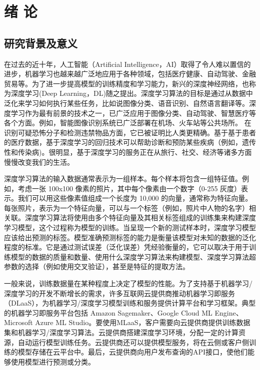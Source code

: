 \chapter{绪\hskip 0.4cm 论}
\label{ch1}

\section{研究背景及意义}
在过去的近十年，人工智能（Artificial Intelligence，AI）取得了令人难以置信的进步，机器学习也越来越广泛地应用于各种领域，包括医疗健康、自动驾驶、金融贸易等。为了进一步提高模型的训练精度和学习能力，新兴的深度神经网络，也称为深度学习(Deep Learning，DL)随之提出。深度学习算法的目标是通过从数据中泛化来学习如何执行某些任务，比如说图像分类、语音识别、自然语言翻译等。深度学习作为最有前景的技术之一，已广泛应用于图像分类、自动驾驶、智慧医疗等各个方面。例如，智能图像识别系统已广泛部署在机场、火车站等公共场所。 在识别可疑恐怖分子和检测违禁物品方面，它已被证明比人类更精确。基于基于患者的医疗数据，基于深度学习的回归技术可以帮助诊断和预防某些疾病（例如，遗传性和传染病)。很明显，基于深度学习的服务正在从旅行、社交、经济等诸多方面慢慢改变我们的生活。

深度学习算法的输入数据通常表示为一组样本。每个样本将包含一组特征值。例如，考虑一张 100x100 像素的照片，其中每个像素由一个数字（0-255 灰度）表示。我们可以用这些像素值组成一个长度为 10,000 的向量，通常称为特征向量。每张照片，表示为一个特征向量，可以与一个标签（例如，照片中人物的名字）相关联。深度学习算法将使用由多个特征向量及其相关标签组成的训练集来构建深度学习模型，这个过程称为模型的训练。当呈现一个新的测试样本时，深度学习模型应该给出预测的标签。模型准确预测标签的能力是衡量该模型对未知的数据的泛化程度的标准。它是通过测试误差（泛化误差）凭经验衡量的，它可以取决于用于训练模型的数据的质量和数量、使用什么深度学习算法来构建模型、深度学习算法超参数的选择（例如使用交叉验证），甚至是特征的提取方法。

一般来说，训练数据量在某种程度上决定了模型的性能。为了支持基于机器学习/深度学习的开发不断增长的需求，许多互联网云提供商推动机器学习即服务（DLaaS），为机器学习/深度学习模型训练和服务提供计算平台和学习框架。典型的机器学习即服务平台包括 Amazon Sagemaker、Google Cloud ML Engine、Microsoft Azure ML Studio。要使用MLaaS，客户需要向云提供商提供训练数据集和机器学习/深度学习算法。云提供商搭建深度学习环境，分配一定的计算资源，自动运行模型训练任务。云提供商还可以提供模型服务，将在云侧或客户侧训练的模型存储在云平台中。最后，云提供商向用户发布查询的API接口，使他们能够使用模型进行预测或分类。

